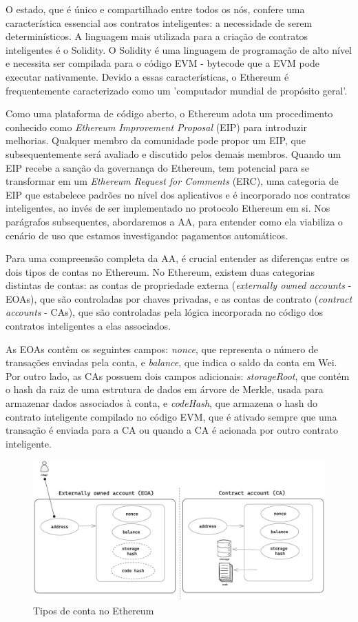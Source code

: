 \documentclass[12pt]{article}
\begin{document}
O estado, que é único e compartilhado entre todos os nós, confere uma característica essencial aos
contratos inteligentes: a necessidade de serem determinísticos. A linguagem mais utilizada para a
criação de contratos inteligentes é o Solidity\cite{16}. O Solidity é uma linguagem de programação
de alto nível e necessita ser compilada para o código EVM - bytecode que a EVM pode executar
nativamente\cite{15}. Devido a essas características, o Ethereum é frequentemente caracterizado
como um 'computador mundial de propósito geral'\cite{6}.

Como uma plataforma de código aberto, o Ethereum adota um procedimento conhecido como
\textit{Ethereum Improvement Proposal} (EIP) \cite{19} para introduzir melhorias. Qualquer membro
da comunidade pode propor um EIP, que subsequentemente será avaliado e discutido pelos demais
membros. Quando um EIP recebe a sanção da governança do Ethereum, tem potencial para se transformar
em um \textit{Ethereum Request for Comments} (ERC), uma categoria de EIP que estabelece padrões no
nível dos aplicativos e é incorporado nos contratos inteligentes, ao invés de ser implementado no
protocolo Ethereum em si. Nos parágrafos subsequentes, abordaremos a AA, para entender como ela
viabiliza o cenário de uso que estamos investigando: pagamentos automáticos.

Para uma compreensão completa da AA, é crucial entender as diferenças entre os dois tipos de contas
no Ethereum. No Ethereum, existem duas categorias distintas de contas: as contas de propriedade
externa (\textit{externally owned accounts} - EOAs), que são controladas por chaves privadas, e as
contas de contrato (\textit{contract accounts} - CAs), que são controladas pela lógica incorporada
no código dos contratos inteligentes a elas associados\cite{3}.

As EOAs contêm os seguintes campos: \textit{nonce}, que representa o número de transações enviadas
pela conta, e \textit{balance}, que indica o saldo da conta em Wei\cite{6}. Por outro lado, as CAs
possuem dois campos adicionais: \textit{storageRoot}, que contém o hash da raiz de uma estrutura de
dados em árvore de Merkle\cite{22}, usada para armazenar dados associados à conta, e
\textit{codeHash}, que armazena o hash do contrato inteligente compilado no código EVM, que é
ativado sempre que uma transação é enviada para a CA ou quando a CA é acionada por outro contrato
inteligente\cite{15}.

\begin{figure}[ht]
  \centering
  \includegraphics[width=.5\textwidth]{./images/account-types.png}
  \caption{Tipos de conta no Ethereum}
  \label{fig:fig1}
\end{figure}
\end{document}
